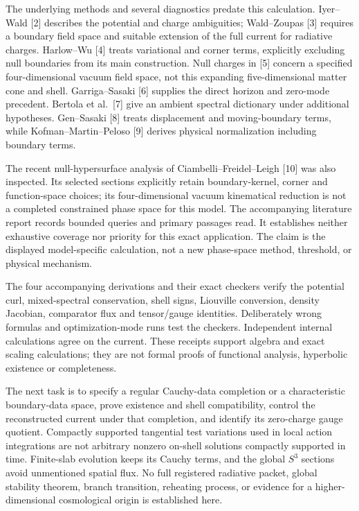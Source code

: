 \documentclass[
  11pt,
]{article}
\begin{document}
The underlying methods and several diagnostics predate this calculation.
Iyer--Wald {[}2{]} describes the potential and charge ambiguities;
Wald--Zoupas {[}3{]} requires a boundary field space and suitable
extension of the full current for radiative charges. Harlow--Wu {[}4{]}
treats variational and corner terms, explicitly excluding null
boundaries from its main construction. Null charges in {[}5{]} concern a
specified four-dimensional vacuum field space, not this expanding
five-dimensional matter cone and shell. Garriga--Sasaki {[}6{]} supplies
the direct horizon and zero-mode precedent. Bertola et al.~{[}7{]} give
an ambient spectral dictionary under additional hypotheses. Gen--Sasaki
{[}8{]} treats displacement and moving-boundary terms, while
Kofman--Martin--Peloso {[}9{]} derives physical normalization including
boundary terms.

The recent null-hypersurface analysis of Ciambelli--Freidel--Leigh
{[}10{]} was also inspected. Its selected sections explicitly retain
boundary-kernel, corner and function-space choices; its four-dimensional
vacuum kinematical reduction is not a completed constrained phase space
for this model. The accompanying literature report records bounded
queries and primary passages read. It establishes neither exhaustive
coverage nor priority for this exact application. The claim is the
displayed model-specific calculation, not a new phase-space method,
threshold, or physical mechanism.

The four accompanying derivations and their exact checkers verify the
potential curl, mixed-spectral conservation, shell signs, Liouville
conversion, density Jacobian, comparator flux and tensor/gauge
identities. Deliberately wrong formulas and optimization-mode runs test
the checkers. Independent internal calculations agree on the current.
These receipts support algebra and exact scaling calculations; they are
not formal proofs of functional analysis, hyperbolic existence or
completeness.

The next task is to specify a regular Cauchy-data completion or a
characteristic boundary-data space, prove existence and shell
compatibility, control the reconstructed current under that completion,
and identify its zero-charge gauge quotient. Compactly supported
tangential test variations used in local action integrations are not
arbitrary nonzero on-shell solutions compactly supported in time.
Finite-slab evolution keeps its Cauchy terms, and the global \(S^3\)
sections avoid unmentioned spatial flux. No full registered radiative
packet, global stability theorem, branch transition, reheating process,
or evidence for a higher-dimensional cosmological origin is established
here.
\end{document}

